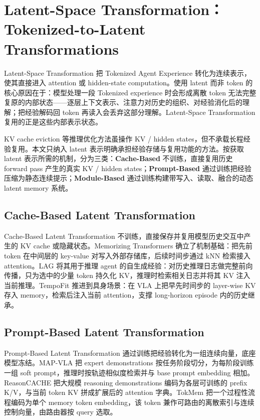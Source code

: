 \section{Latent-Space Transformation：Tokenized-to-Latent Transformations}

Latent-Space Transformation 把 Tokenized Agent Experience 转化为连续表示，使其直接进入 attention 或 hidden-state computation。使用 latent 而非 token 的核心原因在于：模型处理一段 Tokenized experience 时会形成离散 token 无法完整复原的内部状态——逐层上下文表示、注意力对历史的组织、对经验消化后的理解；把经验解码回 token 再读入会丢弃这部分理解。Latent-Space Transformation 复用的正是这些内部表示状态。

KV cache eviction 等推理优化方法虽操作 KV / hidden states，但不承载长程经验复用。本文只纳入 latent 表示明确承担经验存储与复用功能的方法。按获取 latent 表示所需的机制，分为三类：\textbf{Cache-Based} 不训练，直接复用历史 forward pass 产生的真实 KV / hidden states；\textbf{Prompt-Based} 通过训练把经验压缩为静态连续提示；\textbf{Module-Based} 通过训练构建带写入、读取、融合的动态 latent memory 系统。

\subsection{Cache-Based Latent Transformation}

Cache-Based Latent Transformation 不训练，直接保存并复用模型历史交互中产生的 KV cache 或隐藏状态。Memorizing Transformers \cite{Wu22} 确立了机制基础：把先前 token 在中间层的 key-value 对写入外部存储库，后续时间步通过 kNN 检索接入 attention。LAG \cite{Che25b} 将其用于推理 agent 的自生成经验：对历史推理日志做完整前向传播，只为选中的少量 token 持久化 KV，推理时检索相关日志并将其 KV 注入当前推理。TempoFit \cite{Sun26} 推进到具身场景：在 VLA 上把早先时间步的 layer-wise KV 存入 memory，检索后注入当前 attention，支撑 long-horizon episode 内的历史继承。

\subsection{Prompt-Based Latent Transformation}

Prompt-Based Latent Transformation 通过训练把经验转化为一组连续向量，底座模型冻结。MAP-VLA \cite{Li25g} 把 expert demonstrations 按任务阶段切分，为每阶段训练一组 soft prompt，推理时按轨迹相似度检索并与 base prompt embedding 相加。ReasonCACHE \cite{Gup26} 把大规模 reasoning demonstrations 编码为各层可训练的 prefix K/V，与当前 token KV 拼成扩展后的 attention 字典。TokMem \cite{Wu25c} 把一个过程性流程编码为单个 memory token embedding，该 token 兼作可路由的离散索引与连续控制向量，由路由器按 query 选取。

